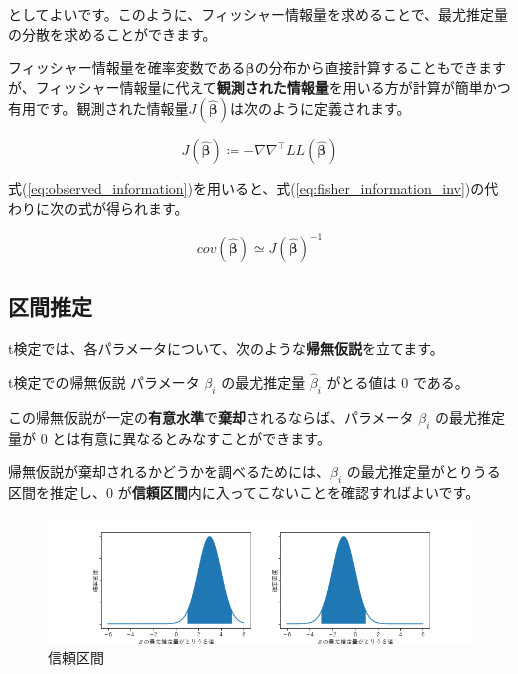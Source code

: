 としてよいです。このように、フィッシャー情報量を求めることで、最尤推定量の分散を求めることができます。

フィッシャー情報量を確率変数である$\bm\beta$の分布から直接計算することもできますが、フィッシャー情報量に代えて\textbf{観測された情報量}を用いる方が計算が簡単かつ有用です\cite{Efron1978}。観測された情報量$J(\bm{\hat\beta})$は次のように定義されます。

\begin{equation}
    \label{eq:observed_information}
    J(\bm{\hat\beta}) \coloneqq -\nabla\nabla^\top LL(\bm{\hat\beta})
\end{equation}

式(\ref{eq:observed_information})を用いると、式(\ref{eq:fisher_information_inv})の代わりに次の式が得られます。

\begin{equation}
    \label{eq:observed_information_inv}
    cov(\bm{\hat\beta}) \simeq J(\bm{\hat\beta})^{-1}
\end{equation}

\subsection{区間推定}\label{ssec:interval_est}

t検定では、各パラメータについて、次のような\textbf{帰無仮説}を立てます。

\begin{itembox}[l]{t検定での帰無仮説}
    パラメータ $\beta_i$ の最尤推定量 $\hat\beta_i$ がとる値は $0$ である。
\end{itembox}

この帰無仮説が一定の\textbf{有意水準}で\textbf{棄却}されるならば、パラメータ $\beta_i$ の最尤推定量が $0$ とは有意に異なるとみなすことができます。

帰無仮説が棄却されるかどうかを調べるためには、$\beta_i$ の最尤推定量がとりうる区間を推定し、$0$ が\textbf{信頼区間}内に入ってこないことを確認すればよいです。

\begin{figure}[ht]
    \centering
    \includegraphics[width=0.9\hsize]{figure/interval_estimation.png}
    \caption{信頼区間}
    \label{fig:interval_est}
\end{figure}


